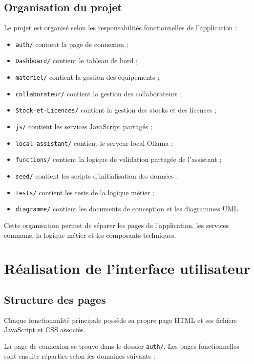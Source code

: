 \documentclass{rapportENSIAS}
\begin{document}
\subsection{Organisation du projet}

Le projet est organisé selon les responsabilités fonctionnelles de l’application :

\begin{itemize}
    \item \texttt{auth/} contient la page de connexion ;
    \item \texttt{Dashboard/} contient le tableau de bord ;
    \item \texttt{materiel/} contient la gestion des équipements ;
    \item \texttt{collaborateur/} contient la gestion des collaborateurs ;
    \item \texttt{Stock-et-Licences/} contient la gestion des stocks et des licences ;
    \item \texttt{js/} contient les services JavaScript partagés ;
    \item \texttt{local-assistant/} contient le serveur local Ollama ;
    \item \texttt{functions/} contient la logique de validation partagée de l’assistant ;
    \item \texttt{seed/} contient les scripts d’initialisation des données ;
    \item \texttt{tests/} contient les tests de la logique métier ;
    \item \texttt{diagramme/} contient les documents de conception et les diagrammes UML.
\end{itemize}

Cette organisation permet de séparer les pages de l’application, les services communs, la logique métier et les composants techniques.

\section{Réalisation de l’interface utilisateur}

\subsection{Structure des pages}

Chaque fonctionnalité principale possède sa propre page HTML et ses fichiers JavaScript et CSS associés.

La page de connexion se trouve dans le dossier \texttt{auth/}. Les pages fonctionnelles sont ensuite réparties selon les domaines suivants :
\end{document}
